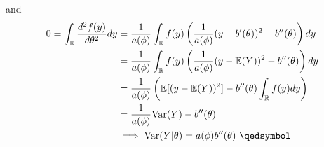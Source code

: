 and 
\begin{equation}
    \begin{aligned}
    0 = \int_{\mathbb{R}} \frac{d^2 f(y)}{d\theta^2} dy &= \frac{1}{a(\phi)} \int_{\mathbb{R}} f(y) \left( \frac{1}{a(\phi)}(y-b'(\theta))^2 - b''(\theta) \right) dy \\
    &= \frac{1}{a(\phi)} \int_{\mathbb{R}} f(y) \left( \frac{1}{a(\phi)} (y-\mathbb{E}(Y))^2 - b''(\theta) \right) dy \\
    &= \frac{1}{ a(\phi)} \left( \mathbb{E}[(y-\mathbb{E}(Y))^2]- b''(\theta) \int_{\mathbb{R}} f(y)dy \right) \\
    & = \frac{1}{a(\phi)}\text{Var}(Y) - b''(\theta) \\
    & \implies \text{Var}(Y \lvert \theta) = a(\phi) b''(\theta) \ \qedsymbol
    \end{aligned}
\end{equation}
